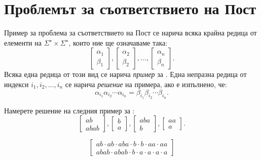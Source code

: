 \section{Проблемът за съответствието на Пост}\label{sect:turing:pcp}


Пример за проблема за съответствието на Пост се нарича всяка крайна редица от елементи на $\Sigma^\star \times \Sigma^\star$,
които ние ще означаваме така:
\[\begin{bmatrix} \alpha_1\\ \beta_1\end{bmatrix},\begin{bmatrix} \alpha_2\\ \beta_2\end{bmatrix},\dots,\begin{bmatrix} \alpha_n\\ \beta_n\end{bmatrix}.\]
Всяка една редица от този вид се нарича {\em пример} за \PCP.
Една непразна редица от индекси $i_1,i_2,\dots,i_n$ се нарича {\em решение} на \PCP примера, ако е изпълнено, че:
\[\alpha_{i_1}\alpha_{i_2}\cdots\alpha_{i_n} = \beta_{i_1}\beta_{i_2}\cdots\beta_{i_n}.\]

\begin{problem}
  Намерете решение на следния пример за \PCP:
  \[\begin{bmatrix}ab\\ abab\end{bmatrix},\begin{bmatrix} b\\ a\end{bmatrix},\begin{bmatrix} aba\\ b\end{bmatrix},\begin{bmatrix} aa\\ a\end{bmatrix}.\]
\end{problem}
\begin{solution}
  \[\begin{bmatrix}ab\cdot ab \cdot aba \cdot b \cdot b \cdot aa \cdot aa\\abab \cdot abab \cdot b \cdot a \cdot a \cdot a \cdot a\end{bmatrix}\]
\end{solution}

